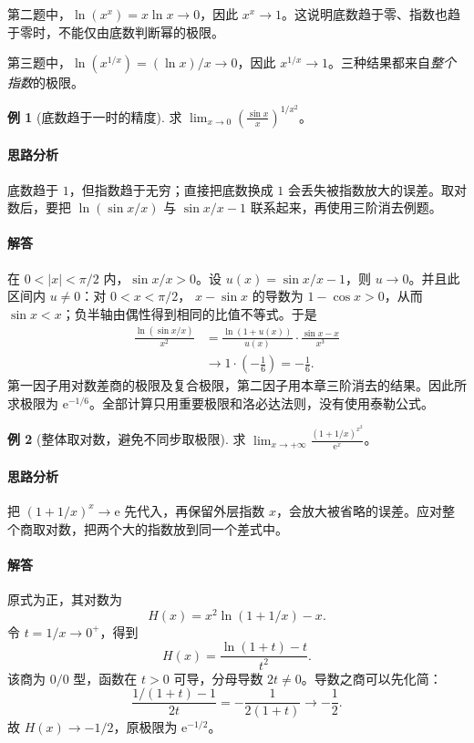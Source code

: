 \documentclass[UTF8,fontset=fandol,12pt,oneside,openany]{ctexrep}
\newcommand{\ee}{\mathrm e}
\theoremstyle{definition}
\newtheorem{example}{例}[chapter]
\begin{document}
第二题中，$\ln(x^x)=x\ln x\to0$，因此 $x^x\to1$。这说明底数趋于零、指数也趋于零时，不能仅由底数判断幂的极限。

第三题中，$\ln(x^{1/x})=(\ln x)/x\to0$，因此 $x^{1/x}\to1$。三种结果都来自\emph{整个指数}的极限。

\begin{example}[底数趋于一时的精度]
求 $\displaystyle\lim_{x\to0}\left(\frac{\sin x}{x}\right)^{1/x^2}$。
\end{example}
\paragraph{思路分析}
底数趋于 $1$，但指数趋于无穷；直接把底数换成 $1$ 会丢失被指数放大的误差。取对数后，要把 $\ln(\sin x/x)$ 与 $\sin x/x-1$ 联系起来，再使用三阶消去例题。
\paragraph{解答}
在 $0<|x|<\pi/2$ 内，$\sin x/x>0$。设 $u(x)=\sin x/x-1$，则 $u\to0$。并且此区间内 $u\ne0$：对 $0<x<\pi/2$，
$x-\sin x$ 的导数为 $1-\cos x>0$，从而 $\sin x<x$；负半轴由偶性得到相同的比值不等式。于是
\begin{align*}
\frac{\ln(\sin x/x)}{x^2}
&=\frac{\ln(1+u(x))}{u(x)}\cdot\frac{\sin x-x}{x^3}\\
&\longrightarrow 1\cdot\left(-\frac16\right)=-\frac16.
\end{align*}
第一因子用对数差商的极限及复合极限，第二因子用本章三阶消去的结果。因此所求极限为 $\ee^{-1/6}$。全部计算只用重要极限和洛必达法则，没有使用泰勒公式。

\begin{example}[整体取对数，避免不同步取极限]
求 $\displaystyle\lim_{x\to+\infty}\frac{(1+1/x)^{x^2}}{\ee^x}$。
\end{example}
\paragraph{思路分析}
把 $(1+1/x)^x\to\ee$ 先代入，再保留外层指数 $x$，会放大被省略的误差。应对整个商取对数，把两个大的指数放到同一个差式中。
\paragraph{解答}
原式为正，其对数为
\[
H(x)=x^2\ln(1+1/x)-x.
\]
令 $t=1/x\to0^+$，得到
\[
H(x)=\frac{\ln(1+t)-t}{t^2}.
\]
该商为 $0/0$ 型，函数在 $t>0$ 可导，分母导数 $2t\ne0$。导数之商可以先化简：
\[
\frac{1/(1+t)-1}{2t}
=-\frac1{2(1+t)}\to-\frac12.
\]
故 $H(x)\to-1/2$，原极限为 $\ee^{-1/2}$。
\end{document}

